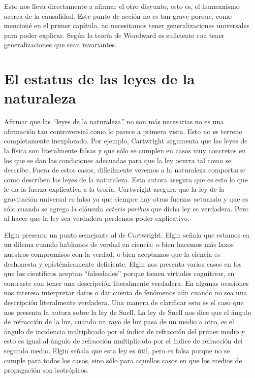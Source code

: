 Esto nos lleva directamente a afirmar el otro disyunto, esto es, el humeanismo acerca de la causalidad. Este punto de acción no es tan grave porque, como mencioné en el primer capítulo, no necesitamos tener generalizaciones universales para poder explicar. Según la teoría de Woodward es suficiente con tener generalizaciones que sean invariantes.

\section{El estatus de las leyes de la naturaleza}

\noindent Afirmar que las ``leyes de la naturaleza'' no son más necesarias no es una afirmación tan controversial como lo parece a primera vista. Esto no es terreno completamente inexplorado. Por ejemplo, Cartwright \citeyear{Cartwright1983} argumenta que las leyes de la física son literalmente falsas y que sólo se cumplen en casos muy concretos en los que se dan las condiciones adecuadas para que la ley ocurra tal como se describe. Fuera de estos casos, difícilmente veremos a la naturaleza comportarse como describen las leyes de la naturaleza. Esta autora asegura que es esto lo que le da la fuerza explicativa a la teoría. Cartwright asegura que la ley de la gravitación universal es falsa ya que siempre hay otras fuerzas actuando y que es sólo cuando se agrega la cláusula \textit{ceteris paribus} que dicha ley es verdadera. Pero al hacer que la ley sea verdadera perdemos poder explicativo.

Elgin presenta un punto semejante al de Cartwright. Elgin \citeyear{Elgin2004} señala que estamos en un dilema cuando hablamos de verdad en ciencia: o bien hacemos más laxos nuestros compromisos con la verdad, o bien aceptamos que la ciencia es deshonesta y epistémicamente deficiente. Elgin nos presenta varios casos en los que los científicos aceptan ``falsedades'' porque tienen virtudes cognitivas, en contraste con tener una descripción literalmente verdadera. En algunas ocasiones nos interesa interpretar datos o dar cuenta de fenómenos aún cuando no sea una descripción literalmente verdadera. Una manera de clarificar esto es el caso que nos presenta la autora sobre la ley de Snell. La ley de Snell nos dice que el ángulo de refracción de la luz, cuando un rayo de luz pasa de un medio a otro, es el ángulo de incidencia multiplicado por el índice de refracción del primer medio y esto es igual al ángulo de refracción multiplicado por el índice de refracción del segundo medio. Elgin señala que esta ley es útil, pero es falsa porque no se cumple para todos los casos, sino sólo para aquellos casos en que los medios de propagación son isotrópicos.

